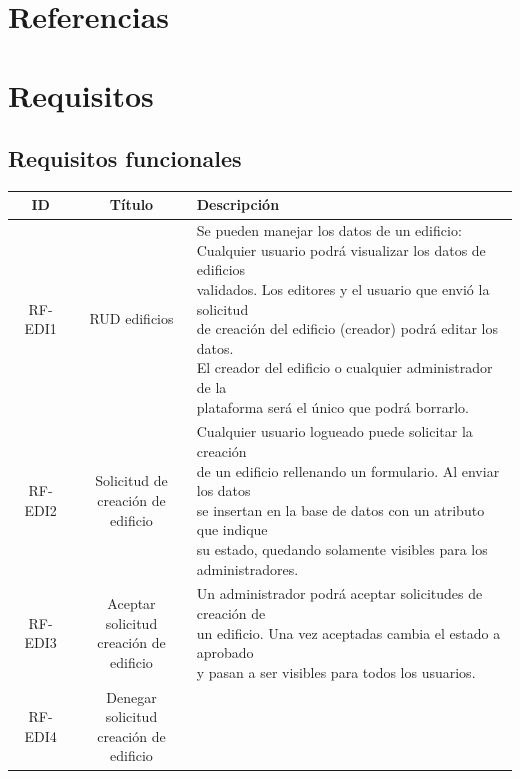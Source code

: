 \documentclass[12pt, a4paper, twoside]{article}
\begin{document}
\section{Referencias}

\section{Requisitos}
\subsection{Requisitos funcionales}
{\footnotesize
\begin{longtable}{ |c|c|l| }
  \hline
  ID      & Título & Descripción \\ \hline
  RF-EDI1 & RUD edificios & \makecell[l]{Se pueden manejar los datos de un edificio: \\
    Cualquier usuario podrá visualizar los datos de edificios \\
    validados. Los editores y el usuario que envió la solicitud\\
    de creación del edificio (creador) podrá editar los datos. \\
    El creador del edificio o cualquier administrador de la \\
    plataforma será el único que podrá borrarlo.
    } \\ \hline
  RF-EDI2 & \makecell{Solicitud de \\ creación de edificio}
    & \makecell[l]{Cualquier usuario logueado puede solicitar la creación\\
    de un edificio rellenando un formulario. Al enviar los datos \\
    se insertan en la base de datos con un atributo que indique \\
    su estado, quedando solamente visibles para los
    \\ administradores. 
    } \\ \hline
  RF-EDI3 & \makecell{Aceptar solicitud \\ creación de edificio}
    & \makecell[l]{Un administrador podrá aceptar solicitudes de creación de \\
    un edificio. Una vez aceptadas cambia el estado a aprobado \\
    y pasan a ser visibles para todos los usuarios.
    }\\ \hline
  RF-EDI4 & \makecell{Denegar solicitud \\ creación de edificio}

\end{longtable}}
\end{document}

